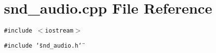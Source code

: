 \section{snd\_\-audio.cpp File Reference}
\label{snd__audio_8cpp}
{\tt \#include $<$iostream$>$}\par
{\tt \#include \char`\"{}snd\_\-audio.h\char`\"{}}\par
